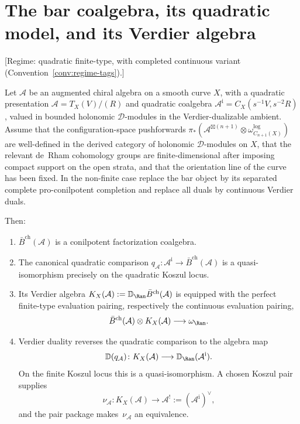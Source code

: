 \section{The bar coalgebra, its quadratic model, and its Verdier algebra}

\begin{theorem}\label{thm:bar-computes-dual}
\textup{[Regime: quadratic finite-type, with completed continuous
variant
\textup{(}Convention~\textup{\ref{conv:regime-tags})}.]}

Let $\mathcal{A}$ be an augmented chiral algebra on a smooth curve $X$,
with a quadratic presentation
$\mathcal A=T_X(V)/(R)$ and quadratic coalgebra
$\mathcal A^{\mathrm i}=C_X(s^{-1}V,s^{-2}R)$,
valued in bounded holonomic $\mathcal{D}$-modules in the
Verdier-dualizable ambient. Assume that the configuration-space
pushforwards $\pi_*(\mathcal{A}^{\boxtimes(n+1)} \otimes \omega^{\log}_{C_{n+1}(X)})$
are well-defined in the derived category of holonomic
$\mathcal{D}$-modules on $X$, that the relevant de~Rham cohomology
groups are finite-dimensional after imposing compact support on the
open strata, and that the orientation line of the curve has been
fixed. In the non-finite case replace the bar object by its separated
complete pro-conilpotent completion and replace all duals by
continuous Verdier duals.

Then:
\begin{enumerate}[label=\textup{(\alph*)}]
\item $\bar{B}^{\mathrm{ch}}(\mathcal{A})$ is a conilpotent
 factorization coalgebra.
\item The canonical quadratic comparison
 $q_{\mathcal A}\colon\mathcal A^{\mathrm i}\to
 \bar{B}^{\mathrm{ch}}(\mathcal A)$ is a quasi-isomorphism precisely
 on the quadratic Koszul locus.
\item Its Verdier algebra
 $K_X(\mathcal A):=\mathbb{D}_{\Ran}\bar{B}^{\mathrm{ch}}(\mathcal{A})$
 is equipped with the perfect finite-type
 evaluation pairing, respectively the continuous evaluation pairing,
 \[
 \bar{B}^{\mathrm{ch}}(\mathcal{A})\otimes
 K_X(\mathcal A) \longrightarrow \omega_{\Ran}.
 \]
\item Verdier duality reverses the quadratic comparison to the
 algebra map
 \[
 \mathbb D(q_{\mathcal A})\colon K_X(\mathcal A)
 \longrightarrow\mathbb D_{\Ran}(\mathcal A^{\mathrm i}).
 \]
 On the finite Koszul locus this is a quasi-isomorphism.  A chosen
 Koszul pair supplies
 \[
 \nu_{\mathcal A}\colon K_X(\mathcal A)\longrightarrow
 \mathcal A^!:=(\mathcal A^{\mathrm i})^\vee,
 \]
 and the pair package makes~$\nu_{\mathcal A}$ an equivalence.
\end{enumerate}
\end{theorem}

